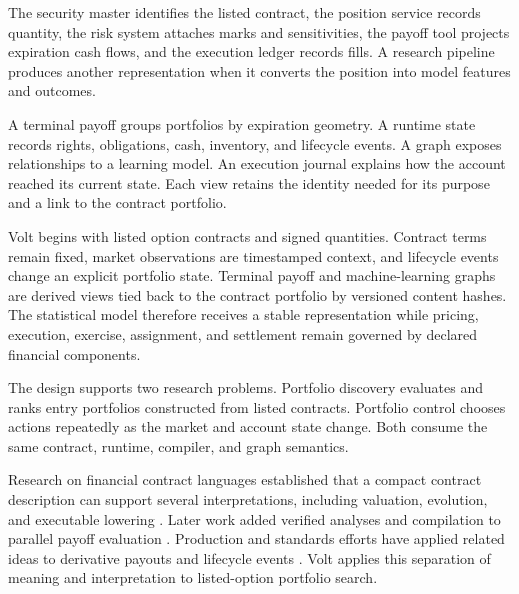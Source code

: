 \documentclass{strategynet-journal}
\newcommand{\VOLT}{\textsf{Volt}}
\begin{document}
\begin{SNcolumns}

The security master identifies the listed contract, the position service
records quantity, the risk system attaches marks and sensitivities, the payoff
tool projects expiration cash flows, and the execution ledger records fills.
A research pipeline produces another representation when it converts the
position into model features and outcomes.

A terminal payoff groups portfolios by expiration geometry.  A runtime state
records rights, obligations, cash, inventory, and lifecycle events.  A graph
exposes relationships to a learning model.  An execution journal explains how
the account reached its current state.  Each view retains the identity needed
for its purpose and a link to the contract portfolio.

\VOLT{} begins with listed option contracts and signed quantities.  Contract
terms remain fixed, market observations are timestamped context, and
lifecycle events change an explicit portfolio state.  Terminal payoff and
machine-learning graphs are derived views tied back to the contract portfolio
by versioned content hashes.  The statistical model therefore receives a
stable representation while pricing, execution, exercise, assignment, and
settlement remain governed by declared financial components.

The design supports two research problems.  Portfolio discovery evaluates and
ranks entry portfolios constructed from listed contracts.  Portfolio control
chooses actions repeatedly as the market and account state change.  Both
consume the same contract, runtime, compiler, and graph semantics.

Research on financial contract languages established that a compact contract
description can support several interpretations, including valuation,
evolution, and executable lowering \cite{arnold1995,peytonjones2000}.  Later
work added verified analyses and compilation to parallel payoff evaluation
\cite{bahr2015,annenkov2018}.  Production and standards efforts have applied
related ideas to derivative payouts and lifecycle events
\cite{frankau2009,actus,cdm}.  \VOLT{} applies this separation of meaning and
interpretation to listed-option portfolio search.

\end{SNcolumns}
\end{document}
